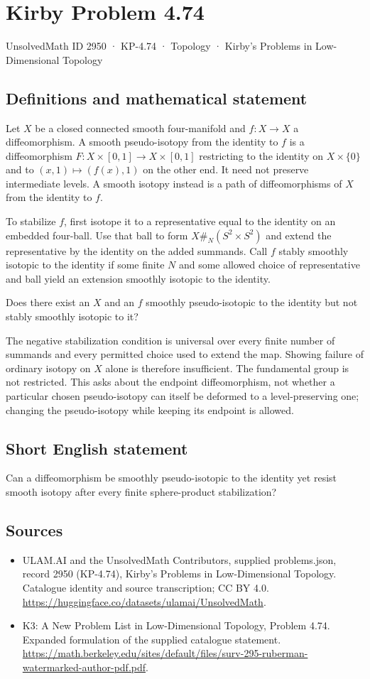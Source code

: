 \documentclass[11pt,a4paper]{article}
\begin{document}
\section*{Kirby Problem 4.74}\label{2950}
{\small UnsolvedMath ID 2950 · KP-4.74 · Topology · Kirby's Problems in Low-Dimensional Topology}
\subsection{Definitions and mathematical statement}
Let $X$ be a closed connected smooth four-manifold and $f:X\to X$ a diffeomorphism. A smooth pseudo-isotopy from the identity to $f$ is a diffeomorphism $F:X\times[0,1]\to X\times[0,1]$ restricting to the identity on $X\times\{0\}$ and to $(x,1)\mapsto(f(x),1)$ on the other end. It need not preserve intermediate levels. A smooth isotopy instead is a path of diffeomorphisms of $X$ from the identity to $f$.

To stabilize $f$, first isotope it to a representative equal to the identity on an embedded four-ball. Use that ball to form $X\#_N(S^2\times S^2)$ and extend the representative by the identity on the added summands. Call $f$ stably smoothly isotopic to the identity if some finite $N$ and some allowed choice of representative and ball yield an extension smoothly isotopic to the identity.

Does there exist an $X$ and an $f$ smoothly pseudo-isotopic to the identity but not stably smoothly isotopic to it?

The negative stabilization condition is universal over every finite number of summands and every permitted choice used to extend the map. Showing failure of ordinary isotopy on $X$ alone is therefore insufficient. The fundamental group is not restricted. This asks about the endpoint diffeomorphism, not whether a particular chosen pseudo-isotopy can itself be deformed to a level-preserving one; changing the pseudo-isotopy while keeping its endpoint is allowed.
\subsection{Short English statement}
Can a diffeomorphism be smoothly pseudo-isotopic to the identity yet resist smooth isotopy after every finite sphere-product stabilization?
\subsection{Sources}
\begin{itemize}
\item[S1] ULAM.AI and the UnsolvedMath Contributors, supplied problems.json, record 2950 (KP-4.74), Kirby's Problems in Low-Dimensional Topology. Catalogue identity and source transcription; CC BY 4.0.
\url{https://huggingface.co/datasets/ulamai/UnsolvedMath}.
\item[S2] K3: A New Problem List in Low-Dimensional Topology, Problem 4.74. Expanded formulation of the supplied catalogue statement.
\url{https://math.berkeley.edu/sites/default/files/surv-295-ruberman-watermarked-author-pdf.pdf}.
\end{itemize}
\end{document}
